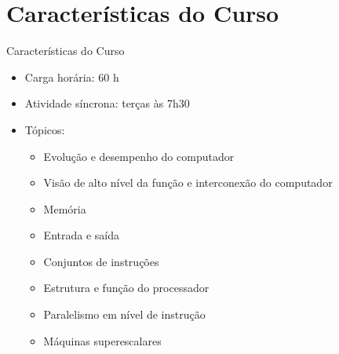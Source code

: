    \section[ slide = true]{Características do Curso}
      \begin{slide}[toc=]{Características do Curso}
         \begin{itemize}
            \item Carga horária: 60 h
            \item Atividade síncrona: terças às 7h30
            \item Tópicos:
            \begin{itemize}
               \item Evolução e desempenho do computador
               \item Visão de alto nível da função e interconexão do computador
               \item Memória
               \item Entrada e saída
               \item Conjuntos de instruções
               \item Estrutura e função do processador
               \item Paralelismo em nível de instrução
               \item Máquinas superescalares
            \end{itemize}
         \end{itemize}         
      \end{slide}
      
